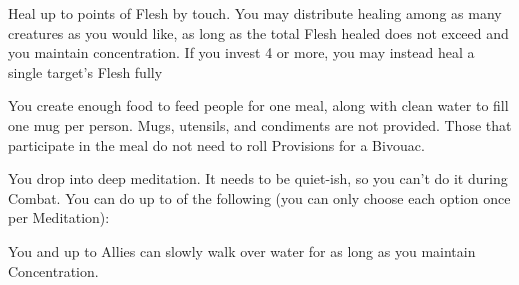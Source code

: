 {    \SACRAMENT [
      Name=Heal,
      Link=mystic-sacrament-lay-on-hands,
      Paradigm=Grace,
      Save=N,
      Duration=Concentration,
      Counter=None,
      Keywords=None,
      Target=Close (touch) Allies
    ]

    Heal up to \SUMDICE points of Flesh by touch. You may distribute healing among as many creatures as you would like, as long as the total Flesh healed does not exceed \SUMDICE and you maintain concentration. If you invest 4 \DICE or more, you may instead heal a single target's Flesh fully






   \SACRAMENT [
      Name=Loaves and Fishes,
      Link=mystic-sacrament-loaves-and-fishes,
      Paradigm=Grace,
      Save=N,
      Duration=0,
      Counter=None,
      Keywords=None,
      Target=Close radius
    ]


    You create enough food to feed \SUMDICE people for one meal, along with clean water to fill one mug per person. Mugs, utensils, and condiments are not provided.  Those that participate in the meal do not need to roll Provisions for a Bivouac.  

    \SACRAMENT [
      Name=Meditation,
      Link=mystic-sacrament-meditation,
      Paradigm=Grace,
      Save=N,
      Duration=0,
      Counter=None,
      Keywords=0,
      Target=Self
    ]

    You drop into deep meditation.  It needs to be quiet-ish, so you can't do it during Combat.  You can do up to \DICE of the following (you can only choose each option once per Meditation):


    \cbreak


    \SACRAMENT [
      Name=Walk on Water,
      Link=mystic-sacrament-walk-water,
      Paradigm=Grace,
      Save=N,
      Duration=Concentration,
      Counter=None,
      Keywords=Splittable,
      Target=Self and \DICE-1 Close (touch) Allies
    ]

    You and up to  Allies can slowly walk over water for as long as you maintain Concentration. 



}
